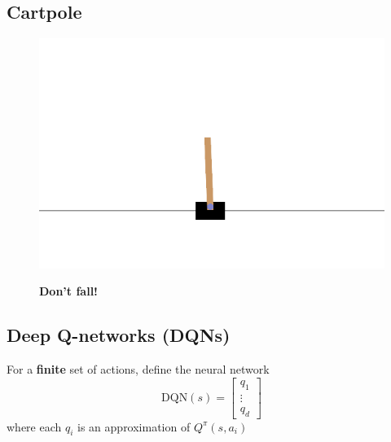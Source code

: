 \documentclass[
  letterpaper,
  DIV=11,
  numbers=noendperiod,
  oneside]{scrartcl}
\begin{document}
\subsection{Cartpole}\label{cartpole}

\begin{figure}

\begin{minipage}{0.65\linewidth}
\includegraphics[width=\textwidth,height=0.9\textheight]{figs/cart_pole.gif}\end{minipage}%
%
\begin{minipage}{0.35\linewidth}
\textbf{Don't fall!}\end{minipage}%

\end{figure}%

\subsection{Deep Q-networks (DQNs)}\label{deep-q-networks-dqns}

For a \textbf{finite} set of actions, define the neural network
\[\text{DQN}(s) =
\begin{bmatrix}
q_1 \\
\vdots \\
q_d
\end{bmatrix}\] where each \(q_i\) is an approximation of
\(Q^\pi (s,a_i)\)

\end{document}
